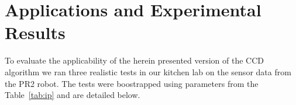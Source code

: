 \documentclass[conference]{IEEEtran}
\begin{document}
\section{Applications and Experimental Results}
\label{sec:results}
To evaluate the applicability of the herein presented version of the CCD algorithm
we ran three realistic tests in our kitchen lab on the sensor data from the 
PR2 robot. The tests were boostrapped using parameters from
the Table~\ref{tab:ip} and are detailed below.

\begin{table}[htbp]
\large
\centering
{}
\caption{initialization parameters}
\label{tab:ip}
\end{table}
\end{document}
